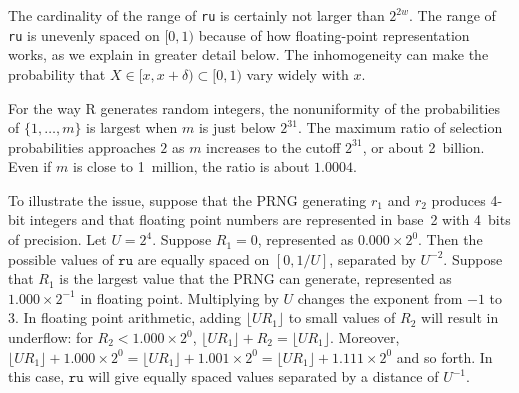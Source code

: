 \documentclass[12pt]{article}
\newcommand{\todo}[1]{{\color{red}{TO DO: \sc #1}}}
\begin{document}
The cardinality of the range of \texttt{ru} is certainly not larger than $2^{2w}$.
The range of \texttt{ru} is unevenly spaced on $[0, 1)$
because of how floating-point representation works, as we explain in greater detail
below.
The inhomogeneity can make the probability that $X \in [x, x+\delta) \subset [0, 1)$
vary widely with $x$.

For the way R generates random integers, the nonuniformity of the probabilities of 
$\{1, \ldots, m\}$ is largest when $m$ is just below $2^{31}$. 
The maximum ratio of selection probabilities approaches $2$ as $m$ increases to the cutoff $2^{31}$, or about 2~billion. 
Even if $m$ is close to 1~million, the ratio is about $1.0004$.

To illustrate the issue, suppose that the PRNG generating $r_1$ and $r_2$ produces 4-bit integers and that floating point numbers 
are represented in base~2 with 4~bits of precision.
Let $U=2^4$.
Suppose $R_1 = 0$, represented as $0.000 \times 2^0$.
Then the possible values of $\texttt{ru}$ are equally spaced on $[0, 1/U]$, separated by $U^{-2}$.
Suppose that $R_1$ is the largest value that the PRNG can generate,
represented as $1.000 \times 2^{-1}$ in floating point.
Multiplying by $U$ changes the exponent from $-1$ to $3$.
In floating point arithmetic, adding $\lfloor U R_1 \rfloor$ to small values of $R_2$ will result in underflow:
for $R_2 < 1.000 \times 2^{0}$, $\lfloor U R_1 \rfloor + R_2 = \lfloor U R_1 \rfloor$. 
Moreover, $\lfloor U R_1 \rfloor + 1.000 \times 2^{0} = \lfloor U R_1 \rfloor + 1.001 \times 2^{0} = \lfloor U R_1 \rfloor + 1.111 \times 2^{0}$ and so forth.
In this case, $\texttt{ru}$ will give equally spaced values separated by a distance of $ U^{-1}$.
\todo{PBS. The way R does it, there won't be ``complete'' underflow unless $R_2$ is sufficiently small.
There are 53 bits available to store what was originally 64 bits of information, but the conversion to
floating point to produce each rand changes things, too.
The fact that the possible values don't have equal probabilities doesn't directly translate into the uniformity/non-uniformity of the distribution on $[0, 1)$, because the spacing is non-uniform, too. 
I think we need to work through one example carefully.
The probability from the ``underflow'' bits will accumulate in the more significant bits. It isn't obvious to me how all this flows down to the uniformity of the resulting distribution, measured, e.g., by the probability of an interval of width $\Delta$. }
\end{document}
